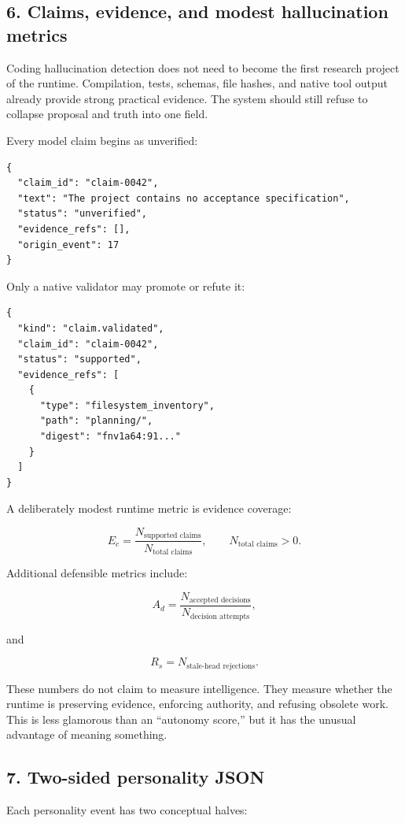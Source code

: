 \subsection{6. Claims, evidence, and modest hallucination metrics}

Coding hallucination detection does not need to become the first research
project of the runtime. Compilation, tests, schemas, file hashes, and native
tool output already provide strong practical evidence. The system should still
refuse to collapse proposal and truth into one field.

Every model claim begins as unverified:

\begin{verbatim}
{
  "claim_id": "claim-0042",
  "text": "The project contains no acceptance specification",
  "status": "unverified",
  "evidence_refs": [],
  "origin_event": 17
}
\end{verbatim}

Only a native validator may promote or refute it:

\begin{verbatim}
{
  "kind": "claim.validated",
  "claim_id": "claim-0042",
  "status": "supported",
  "evidence_refs": [
    {
      "type": "filesystem_inventory",
      "path": "planning/",
      "digest": "fnv1a64:91..."
    }
  ]
}
\end{verbatim}

A deliberately modest runtime metric is evidence coverage:

\[
E_c=
\frac{N_{\text{supported claims}}}
{N_{\text{total claims}}},
\qquad
N_{\text{total claims}}>0.
\]

Additional defensible metrics include:

\[
A_d=
\frac{N_{\text{accepted decisions}}}
{N_{\text{decision attempts}}},
\]

and

\[
R_s=N_{\text{stale-head rejections}}.
\]

These numbers do not claim to measure intelligence. They measure whether the
runtime is preserving evidence, enforcing authority, and refusing obsolete
work. This is less glamorous than an ``autonomy score,'' but it has the unusual
advantage of meaning something.

\subsection{7. Two-sided personality JSON}

Each personality event has two conceptual halves:


